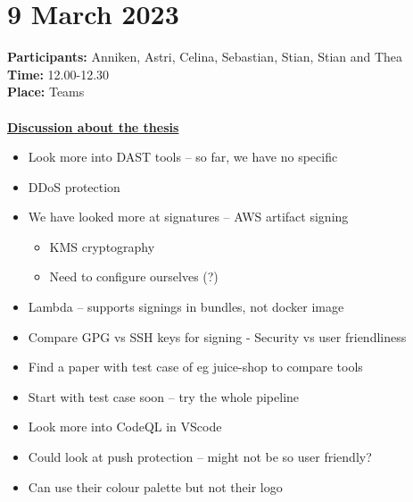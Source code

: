 \section{9 March 2023}
\textbf{Participants:} Anniken, Astri, Celina, Sebastian, Stian, Stian and Thea \\
\textbf{Time:} 12.00-12.30 \\
\textbf{Place:} Teams
\\~\\
\textbf{\underline{Discussion about the thesis}}
\begin{itemize}
    \item Look more into DAST tools – so far, we have no specific
    \item DDoS protection 
    \item We have looked more at signatures – AWS artifact signing
        \begin{itemize}
            \item KMS cryptography 
            \item Need to configure ourselves (?)
        \end{itemize}
    \item Lambda – supports signings in bundles, not docker image
    \item Compare GPG vs SSH keys for signing - Security vs user friendliness
    \item Find a paper with test case of eg juice-shop to compare tools
    \item Start with test case soon – try the whole pipeline
    \item Look more into CodeQL in VScode
    \item Could look at push protection – might not be so user friendly?
    \item Can use their colour palette but not their logo
\end{itemize}

